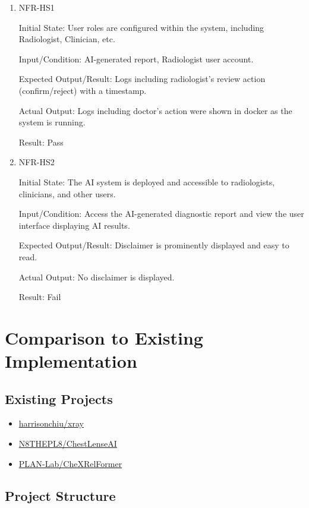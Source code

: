 \documentclass[12pt, titlepage]{article}
\begin{document}
\begin{enumerate}

  \item{NFR-HS1\\}\label{NFR-HS1}

  Initial State: User roles are configured within the system, including Radiologist, Clinician, etc.

  Input/Condition: AI-generated report, Radiologist user account.

  Expected Output/Result: Logs including radiologist’s review action (confirm/reject) with a timestamp.

  Actual Output: Logs including doctor's action were shown in docker as the system is running.

  Result: Pass

  \item{NFR-HS2\\}\label{NFR-HS2}

  Initial State: The AI system is deployed and accessible to radiologists, clinicians, and other users.

  Input/Condition: Access the AI-generated diagnostic report and view the user interface displaying AI results.

  Expected Output/Result: Disclaimer is prominently displayed and easy to read.

  Actual Output: No disclaimer is displayed.

  Result: Fail
  \end{enumerate}
	
\section{Comparison to Existing Implementation}	

\subsection{Existing Projects}
\begin{itemize}
    \item \href{https://github.com/harrisonchiu/xray/tree/main}{harrisonchiu/xray}
    \item \href{https://github.com/N8THEPL8/ChestLenseAI/tree/main}{N8THEPL8/ChestLenseAI}
    \item \href{https://github.com/PLAN-Lab/CheXRelFormer/tree/main}{PLAN-Lab/CheXRelFormer}
\end{itemize}

\subsection{Project Structure}
\end{document}
